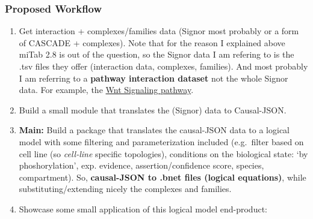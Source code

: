 \documentclass[
  12pt,
]{book}
\begin{document}
\hypertarget{proposed-workflow}{%
\subsubsection*{Proposed Workflow}\label{proposed-workflow}}

\begin{enumerate}
\def\labelenumi{\arabic{enumi}.}
\item
  Get interaction + complexes/families data (Signor most probably or a form of CASCADE + complexes).
  Note that for the reason I explained above miTab 2.8 is out of the question, so the Signor data I am refering to is the .tsv files they offer (interaction data, complexes, families).
  And most probably I am referring to a \textbf{pathway interaction dataset} not the whole Signor data.
  For example, the \href{https://signor.uniroma2.it/pathway_browser.php?organism=human\&pathway_list=SIGNOR-WNT\&level=1}{Wnt Signaling pathway}.
\item
  Build a small module that translates the (Signor) data to Causal-JSON.
\item
  \hypertarget{causalJSONPoint3}{}

  \textbf{Main:} Build a package that translates the causal-JSON data to a logical model with some filtering and parameterization included (e.g.~filter based on cell line (so \emph{cell-line} specific topologies), conditions on the biological state: `by phoshorylation', exp. evidence, assertion/confidence score, species, compartment). So, \textbf{causal-JSON to .bnet files (logical equations)}, while substituting/extending nicely the complexes and families.
\item
  Showcase some small application of this logical model end-product:


\end{enumerate}
\end{document}
